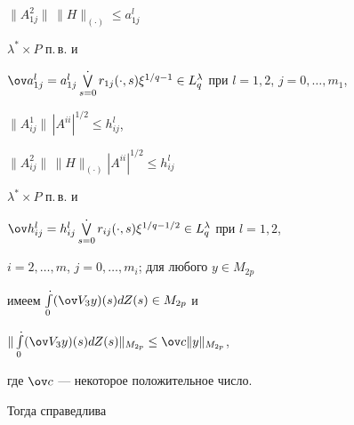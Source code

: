 $\|A^2_{1j}\|\,\|H\|_{(\cdot)} \le a^l_{1j}$\;


$\lambda^*\times P$ п.\,в. и 


$\ov a^l_{1j} = a^l_{1j}\bigvee \limits_{s=0}^{\displaystyle .}r_{1j}(\cdot,s)


\xi^{1/q-1} \in L_q^\lambda$ при $l =1,2$, $j = 0,\dotsc, m_1$, 


$\|A^1_{ij}\|\,|A^{ii}|^{1/2} \le h^l_{ij}$, 


$\|A^2_{ij}\|\,\|H\|_{(\cdot)}|A^{ii}|^{1/2} \le h^l_{ij}$\;


$\lambda^*\times P$ п.\,в. и 


$\ov h^l_{ij} = h^l_{ij}\bigvee \limits_{s=0}^{\displaystyle .}r_{ij}(\cdot,s)


\xi^{1/q-1/2} \in L_q^\lambda $ при $l = 1, 2$, 


$i = 2,\dotsc, m$, $j = 0,\dotsc, m_i$; для любого $y \in M_{2p}$ 


имеем $\int \limits_0^{\displaystyle .}(\ov V_3y)(s)dZ(s) \in M_{2p}$ и 


$\|\int \limits_0^{\displaystyle .}(\ov V_3y)(s)dZ(s)\|_{M_{2p}}


\le \ov c\|y\|_{M_{2p}}$, 


где $\ov c$ --- некоторое положительное число. 


Тогда справедлива





